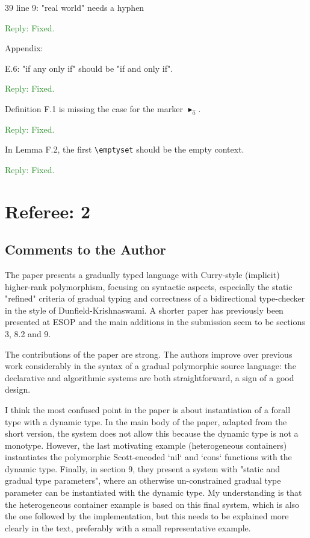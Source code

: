 \documentclass[dvipsnames]{article}
\newcommand\reply[1]{\textcolor{ForestGreen}{Reply: #1}}
\begin{document}
39 line 9: "real world" needs a hyphen 

\reply{Fixed.}

Appendix: 

E.6: "if any only if" should be "if and only if". 

\reply{Fixed.}

Definition F.1 is missing the case for the marker $\blacktriangleright_{ \widehat{a} }$.

\reply{Fixed.}

In Lemma F.2, the first \verb|\emptyset| should be the empty context.

\reply{Fixed.}


\section{Referee: 2 }

\subsection{Comments to the Author}

The paper presents a gradually typed language with
Curry-style (implicit) higher-rank polymorphism, focusing on syntactic aspects,
especially the static "refined" criteria of gradual typing and correctness of a
bidirectional type-checker in the style of Dunfield-Krishnaswami. A shorter
paper has previously been presented at ESOP and the main additions in the
submission seem to be sections 3, 8.2 and 9.

The contributions of the paper are strong. The authors improve over previous
work considerably in the syntax of a gradual polymorphic source language: the
declarative and algorithmic systems are both straightforward, a sign of a good
design.

I think the most confused point in the paper is about instantiation of a forall
type with a dynamic type. In the main body of the paper, adapted from the short
version, the system does not allow this because the dynamic type is not a
monotype. However, the last motivating example (heterogeneous containers)
instantiates the polymorphic Scott-encoded `nil` and `cons` functions with the
dynamic type. Finally, in section 9, they present a system with "static and
gradual type parameters", where an otherwise un-constrained gradual type
parameter can be instantiated with the dynamic type. My understanding is that
the heterogeneous container example is based on this final system, which is also
the one followed by the implementation, but this needs to be explained more
clearly in the text, preferably with a small representative example.
\end{document}

